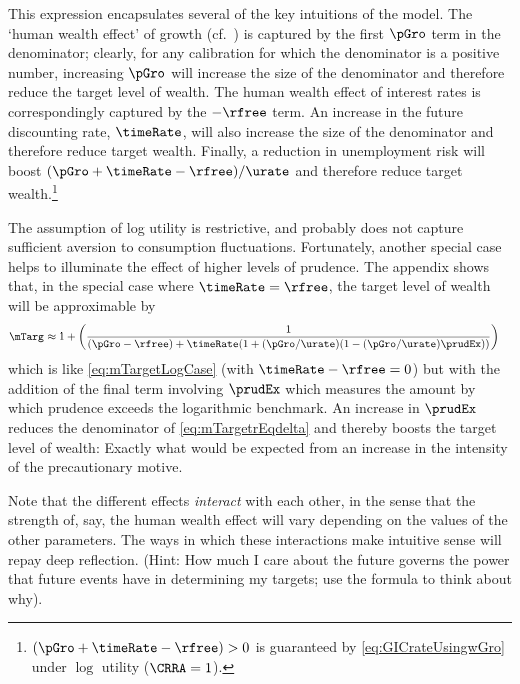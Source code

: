 \documentclass{handout}
\begin{document}
This expression encapsulates several of the key intuitions of the model.  The
`human wealth effect' of growth (cf.\ \cite{summersCapTax}) is captured by the first $\pGro$ term in the denominator;
clearly, for any calibration for which the denominator is a positive number, increasing
$\pGro$ will increase the size of the denominator and therefore reduce the target
level of wealth.  The human wealth effect of interest rates is  correspondingly captured
by the $-\rfree$ term.  An increase in the future discounting rate, $\timeRate$, will also
increase the size of the denominator and therefore reduce target wealth.  Finally,
a reduction in unemployment risk will boost $(\pGro+\timeRate-\rfree)/\urate$ and therefore reduce target
wealth.\footnote{$(\pGro+\timeRate-\rfree) > 0$ is guaranteed by \eqref{eq:GICrateUsingwGro} under $\log$ utility ($\CRRA=1$).}

The assumption of log utility is restrictive, and probably does not capture
sufficient aversion to consumption fluctuations.  Fortunately, another special
case helps to illuminate the effect of higher levels of prudence.  The appendix shows that, in the special case where $\timeRate=\rfree$, the
target level of wealth will be approximable by
\begin{equation}\begin{gathered}\begin{aligned}
 \mTarg^{\null} & \approx  1 + \left(\frac{1}{(\pGro-\rfree)+\timeRate(1+(\pGro/\urate)(1-(\pGro/\urate)\prudEx))}\right) \label{eq:mTargetrEqdelta}
\end{aligned}\end{gathered}\end{equation}
which is like \eqref{eq:mTargetLogCase} (with $\timeRate-\rfree=0$) but with the addition of the final term involving $\prudEx$ which measures the amount by which prudence exceeds the logarithmic benchmark.
An increase in $\prudEx$ reduces the denominator of \eqref{eq:mTargetrEqdelta}
and thereby boosts the target level of wealth: Exactly what would be expected from
an increase in the intensity of the precautionary motive.

Note that the different effects {\it interact} with each other, in the
sense that the strength of, say, the human wealth effect will vary
depending on the values of the other parameters.  The ways in which
these interactions make intuitive sense will repay deep reflection.
(Hint: How much I care about the future governs the power that future
events have in determining my targets; use the formula to think about why).
\end{document}
